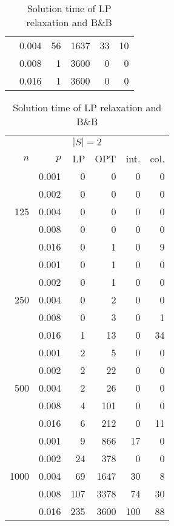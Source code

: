 \begin{table}[]
\begin{minipage}{.45\linewidth}
\begin{tabular}{rrrrrr}
 & 0.004 & 56  &1637& 33&10 \\
 & 0.008 &  1  &3600& 0 & 0 \\
 & 0.016 &  1  &3600& 0 & 0 
\end{tabular}
\end{minipage}
\hspace{1.5cm}
\begin{minipage}{.45\linewidth}
\begin{tabular}{rrrrrr}
\multicolumn{6}{c}{$|S|=2$}  \\
$n$ & $p$ & LP  & OPT & int. & col. \\
\hline
\multirow{5}{*}{125} 
& 0.001 &  0  &  0 &  0  &  0\\
& 0.002 &  0  &  0 &  0  &  0\\
& 0.004 &  0  &  0 &  0  &  0\\ 
& 0.008 &  0  &  0 &  0  &  0\\
& 0.016 &  0  &  1 &  0  &  9\\ 
\hline
\multirow{5}{*}{250} 
& 0.001 &  0  &  1 & 0   & 0 \\
& 0.002 &  0  &  1 & 0   & 0 \\
& 0.004 &  0  &  2 & 0   & 0 \\
& 0.008 &  0  &  3 & 0   & 1 \\
& 0.016 &  1  & 13 & 0   &34 \\
\hline
\multirow{5}{*}{500} 
& 0.001 &  2  &  5 & 0   & 0 \\
& 0.002 &  2  & 22 & 0   & 0 \\
& 0.004 &  2  & 26 & 0   & 0 \\
& 0.008 &  4  &101 & 0   & 0 \\
& 0.016 &  6  &212 & 0   &11 \\
\hline
\multirow{5}{*}{1000} 
& 0.001 &  9  &866   & 17 & 0  \\
& 0.002 &  24 &378   & 0  & 0  \\
& 0.004 &  69 &1647  & 30 & 8  \\
& 0.008 &  107&3378  & 74 &30  \\
& 0.016 &  235&3600  &100 &88 
\end{tabular}
\end{minipage}
\caption{Solution time of LP relaxation and B\&B}
\end{table}
			  
